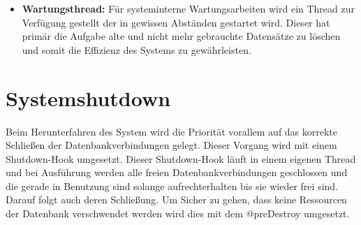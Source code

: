 \begin{itemize}
			\item \textbf{Wartungsthread:}
			Für systeminterne Wartungsarbeiten wird ein Thread zur Verfügung gestellt der in gewissen Abständen gestartet wird. Dieser hat primär die Aufgabe alte und nicht mehr gebrauchte Datensätze zu löschen und somit die Effizienz des Systems zu gewährleisten.
		\end{itemize} 
	
\section{Systemshutdown}

	Beim Herunterfahren des System wird die Priorität vorallem auf das korrekte Schließen der Datenbankverbindungen gelegt. Dieser Vorgang wird mit einem Shutdown-Hook umgesetzt. Dieser Shutdown-Hook läuft in einem eigenen Thread und bei Ausführung werden alle freien Datenbankverbindungen geschlossen und die gerade in Benutzung sind solange aufrechterhalten bis sie wieder frei sind. Darauf folgt auch deren Schließung. Um Sicher zu gehen, dass keine Ressourcen der Datenbank verschwendet werden wird dies mit dem @preDestroy umgesetzt. 
   